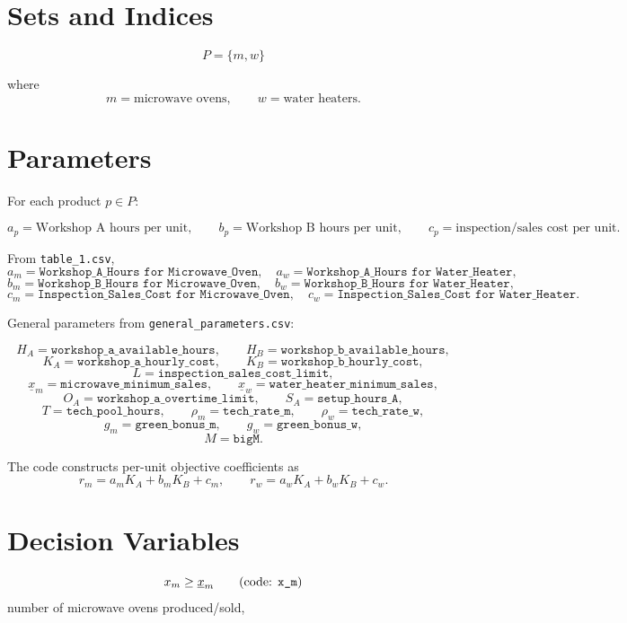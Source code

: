 \section*{Sets and Indices}

\[
P=\{m,w\}
\]

where
\[
m=\text{microwave ovens}, \qquad w=\text{water heaters}.
\]

\section*{Parameters}

For each product \(p\in P\):

\[
a_p = \text{Workshop A hours per unit},
\qquad
b_p = \text{Workshop B hours per unit},
\qquad
c_p = \text{inspection/sales cost per unit}.
\]

From \texttt{table\_1.csv},
\[
a_m=\texttt{Workshop\_A\_Hours for Microwave\_Oven}, \quad
a_w=\texttt{Workshop\_A\_Hours for Water\_Heater},
\]
\[
b_m=\texttt{Workshop\_B\_Hours for Microwave\_Oven}, \quad
b_w=\texttt{Workshop\_B\_Hours for Water\_Heater},
\]
\[
c_m=\texttt{Inspection\_Sales\_Cost for Microwave\_Oven}, \quad
c_w=\texttt{Inspection\_Sales\_Cost for Water\_Heater}.
\]

General parameters from \texttt{general\_parameters.csv}:

\[
H_A=\texttt{workshop\_a\_available\_hours}, \qquad
H_B=\texttt{workshop\_b\_available\_hours},
\]
\[
K_A=\texttt{workshop\_a\_hourly\_cost}, \qquad
K_B=\texttt{workshop\_b\_hourly\_cost},
\]
\[
L=\texttt{inspection\_sales\_cost\_limit},
\]
\[
\underline{x}_m=\texttt{microwave\_minimum\_sales}, \qquad
\underline{x}_w=\texttt{water\_heater\_minimum\_sales},
\]
\[
O_A=\texttt{workshop\_a\_overtime\_limit},
\qquad
S_A=\texttt{setup\_hours\_A},
\]
\[
T=\texttt{tech\_pool\_hours},
\qquad
\rho_m=\texttt{tech\_rate\_m},
\qquad
\rho_w=\texttt{tech\_rate\_w},
\]
\[
g_m=\texttt{green\_bonus\_m}, \qquad
g_w=\texttt{green\_bonus\_w},
\]
\[
M=\texttt{bigM}.
\]

The code constructs per-unit objective coefficients as
\[
r_m = a_m K_A + b_m K_B + c_m,
\qquad
r_w = a_w K_A + b_w K_B + c_w.
\]

\section*{Decision Variables}

\[
x_m \ge \underline{x}_m
\qquad
\text{(code: \texttt{x\_m})}
\]
number of microwave ovens produced/sold,


